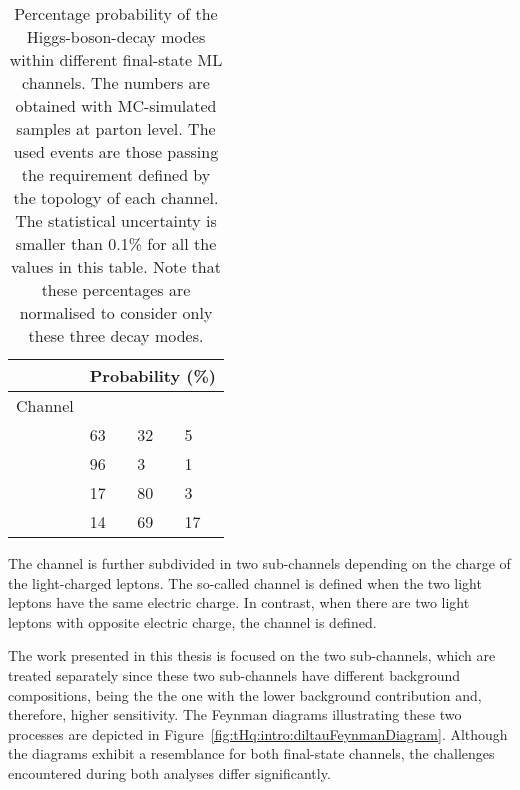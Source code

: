 \begin{table}[h]
\centering
\begin{tabular}{l|lll}
\toprule
 &\multicolumn{3}{c}{Probability (\%)}     \\ 
\midrule
Channel  	& \Htautau & \HWW	& \HZZ \\
\midrule
\dileptau 	& 63      	& 32  	& 5   \\
\lepditau 	& 96      	& 3   		& 1   \\
\dilepSS  	& 17      	& 80  	& 3   \\
\trilep   	& 14      	& 69  	& 17 \\
\bottomrule	
\end{tabular}
\caption{Percentage probability of the Higgs-boson-decay modes 
within different final-state ML channels. The numbers are obtained with 
MC-simulated samples at parton level.
The used events are those passing the requirement defined by the topology of each channel. 
The statistical uncertainty is smaller than 0.1\% for all the values in this table.
Note that these percentages are normalised to consider only these three decay modes.}
\label{tab:ChaptH:tHqChannelsYields}
\end{table}

The \dileptau channel is further subdivided in two sub-channels depending 
on the charge of the light-charged leptons.
The so-called \dilepSStau channel is defined when the two 
light leptons have the same electric charge. In contrast, when there are two light leptons with opposite electric charge,
the \dilepOStau channel is defined. %


The work presented in this thesis is focused on the two \dileptau sub-channels, which are
treated separately since these two sub-channels have different background compositions, being the \dilepSStau
the one with the lower background contribution and, therefore, higher sensitivity. The Feynman diagrams illustrating these two 
processes are depicted in Figure~\ref{fig:tHq:intro:diltauFeynmanDiagram}. Although the 
diagrams exhibit a resemblance for both final-state channels, the challenges encountered 
during both analyses differ significantly.

